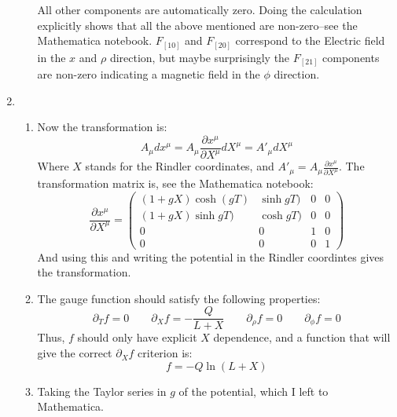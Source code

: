 \documentclass[12pt,a4]{article}
\begin{document}
\begin{enumerate}
\begin{enumerate}
        All other components are automatically zero.
        Doing the calculation explicitly shows that all the above mentioned are non-zero--see the Mathematica notebook.
        $F_{[10]}$ and $F_{[20]}$ correspond to the Electric field in the $x$ and $\rho$ direction, but maybe surprisingly the $F_{[21]}$ components are non-zero indicating a magnetic field in the $\phi$ direction.
    \end{enumerate}
  \item
    \begin{enumerate}
      \item
        Now the transformation is:
        \begin{equation*}
          A_\mu dx^\mu = A_\mu \frac{\partial x^\mu}{\partial X^\mu} dX^\mu = A'_\mu dX^\mu
        \end{equation*}
        Where $X$ stands for the Rindler coordinates, and $A'_\mu = A_\mu \frac{\partial x^\mu}{\partial X^\mu}$.
        The transformation matrix is, see the Mathematica notebook:
        \begin{equation*}
          \frac{\partial x^\mu}{\partial X^\mu}
          =
          \left(
          \begin{matrix*}
            (1+g X) \cosh(g T)&\sinh g T)&0&0\\
            (1+g X) \sinh g T)&\cosh g T)&0&0\\
            0&0&1&0\\
            0&0&0&1
          \end{matrix*}
          \right)
        \end{equation*}
        And using this and writing the potential in the Rindler coordintes gives the transformation.
      \item
        The gauge function should satisfy the following properties:
        \begin{equation*}
          \partial_T f = 0 \qquad \partial_X f = -\frac{Q}{L + X} \qquad \partial_\rho f = 0 \qquad \partial_\phi f = 0
        \end{equation*}
        Thus, $f$ should only have explicit $X$ dependence, and a function that will give the correct $\partial_X f$ criterion is:
        \begin{equation*}
          f = - Q \ln(L + X)
        \end{equation*}
      \item
        Taking the Taylor series in $g$ of the potential, which I left to Mathematica.
        \begin{align*}

\end{align*}
\end{enumerate}
\end{enumerate}
\end{document}
